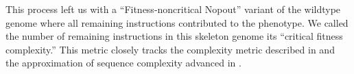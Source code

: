 This process left us with a ``Fitness-noncritical Nopout'' variant of the wildtype genome where all remaining instructions contributed to the phenotype.
We called the number of remaining instructions in this skeleton genome its ``critical fitness complexity.''
This metric closely tracks the complexity metric described in \citep{dolson2019modes} and the approximation of sequence complexity advanced in \citep{adami2000evolution}.





